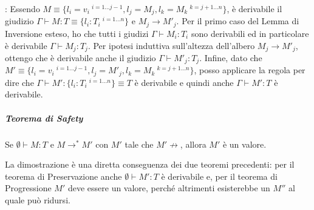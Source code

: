 \vspace{10px}

: Essendo $M \equiv \{ l_i = v_i \:^{i = 1 \ldots j-1}, l_j = M_j, l_k = M_k \:^{k = j+1\ldots n}\}$, \`e derivabile il giudizio $\Gamma \vdash M : T \equiv \{ l_i : T_i \:^{i = 1 \ldots n} \}$ e $M_j \to M'_j$.
Per il primo caso del Lemma di Inversione esteso, ho che tutti i giudizi $\Gamma \vdash M_i : T_i$ sono derivabili ed in particolare \`e derivabile $\Gamma \vdash M_j : T_j$.
Per ipotesi induttiva sull'altezza dell'albero $M_j \to M'_j$, ottengo che \`e derivabile anche il giudizio $\Gamma \vdash M'_j : T_j$.
Infine, dato che $M' \equiv \{ l_i = v_i \:^{i = 1 \ldots j-1}, l_j = M'_j, l_k = M_k \:^{k = j+1\ldots n}\}$, posso applicare la regola  per dire che  $\Gamma \vdash M' : \{ l_i : T_i \:^{i = 1 \ldots n} \} \equiv T$ \`e derivabile e quindi anche $\Gamma \vdash M' : T$ \`e derivabile.

\subparagraph{Teorema di Safety}

\begin{centering}
	Se $\emptyset \vdash M :T$ e $M \to^* M'$ con $M'$ tale che $M' \not\to$, allora $M'$ \`e un valore.
\end{centering}

\noindent La dimostrazione \`e una diretta conseguenza dei due teoremi precedenti: per il teorema di Preservazione anche $\emptyset \vdash M': T$ \`e derivabile e, per il teorema di Progressione $M'$ deve essere un valore, perch\'e altrimenti esisterebbe un $M''$ al quale pu\`o ridursi.


	